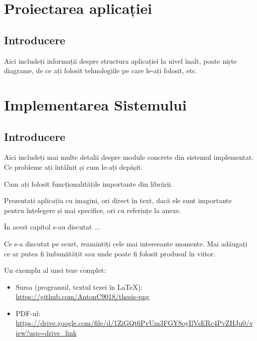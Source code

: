 \documentclass[a4paper,12pt]{report}
\begin{document}
\chapter{Proiectarea aplicației}\label{architecture_chapter_title}

\section{Introducere}

Aici includeți informații despre structura aplicației la nivel înalt, 
poate niște diagrame, de ce ați folosit tehnologiile pe care le-ați folosit, etc.


\chapter{Implementarea Sistemului}\label{implementation_chapter_title}

\section{Introducere}

Aici includeți mai multe detalii despre module concrete din sistemul implementat.
Ce probleme ați întâlnit și cum le-ați depășit.

Cum ați folosit funcționalitățile importante din librării.

Prezentați aplicația cu imagini, ori direct în text, 
dacă ele sunt importante pentru înțelegere și mai specifice,
ori cu referințe la anexe.


În acest capitol s-au discutat ...

\finalConclusionChapter

Ce s-a discutat pe scurt, reamintiți cele mai interesante momente.
Mai adăugați ce ar putea fi îmbunătățit sau unde poate fi folosit produsul în viitor.

Un exemplu al unei teze complet:
\begin{itemize}
  \item Sursa (programul, textul tezei în \LaTeX{}): \url{https://github.com/AntonC9018/thesis-png}
  \item PDF-ul: \url{https://drive.google.com/file/d/1ZiGQt6PvUm3FGY8oyIlVsERc4PvZHJu0/view?usp=drive_link}
\end{itemize}
\end{document}
